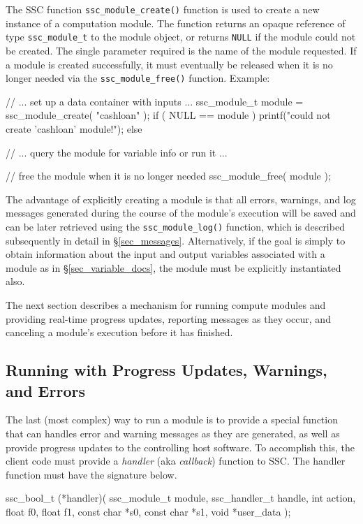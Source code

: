 \documentclass{scrartcl} %
\newcommand{\+}{\discretionary{\mbox{\scriptsize$\hookleftarrow$}}{}{}}
\begin{document}
The SSC function \texttt{ssc\_module\_create()} function is used to create a new instance of a computation module.  The function returns an opaque reference of type \texttt{ssc\_module\_t} to the module object, or returns \texttt{NULL} if the module could not be created.  The single parameter required is the name of the module requested.  If a module is created successfully, it must eventually be released when it is no longer needed via the \texttt{ssc\_module\_free()} function.  Example:

\begin{verbatimtab}[4]
// ... set up a data container with inputs ...
ssc_module_t module = ssc_module_create( "cashloan" );
if ( NULL == module )
	printf("could not create 'cashloan' module!\n");
else
{
	// ... query the module for variable info or run it ...

	// free the module when it is no longer needed
	ssc_module_free( module );
}
\end{verbatimtab}

The advantage of explicitly creating a module is that all errors, warnings, and log messages generated during the course of the module's execution will be saved and can be later retrieved using the \texttt{ssc\_module\_log()} function, which is described subsequently in detail in \S\ref{sec_messages}.  Alternatively, if the goal is simply to obtain information about the input and output variables associated with a module as in \S\ref{sec_variable_docs}, the module must be explicitly instantiated also.

The next section describes a mechanism for running compute modules and providing real-time progress updates, reporting messages as they occur, and canceling a module's execution before it has finished.

\subsection{Running with Progress Updates, Warnings, and Errors}
\label{sec_errors}

The last (most complex) way to run a module is to provide a special function that can handles error and warning messages as they are generated, as well as provide progress updates to the controlling host software.  To accomplish this, the client code must provide a \emph{handler} (aka \emph{callback}) function to SSC.  The handler function must have the signature below.

\begin{verbatimtab}
ssc_bool_t (*handler)( ssc_module_t module, 
	ssc_handler_t handle, 
	int action, 
	float f0, 
	float f1, 
	const char *s0, 
	const char *s1, 
	void *user_data );
\end{verbatimtab}
\end{document}
